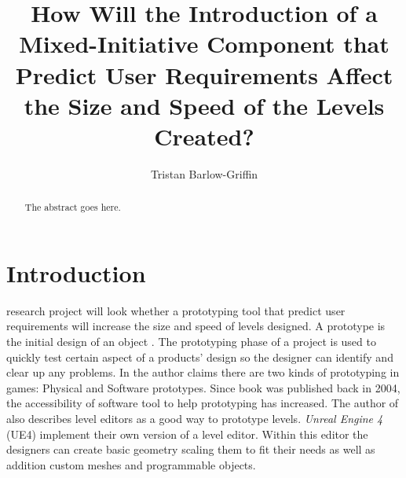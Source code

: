 \documentclass[journal]{IEEEtran}
\begin{document}
%
\title{ How Will the Introduction of a Mixed-Initiative Component that Predict User Requirements Affect the Size and Speed of the Levels Created?}
%
%

\author{Tristan Barlow-Griffin}


\maketitle

\begin{abstract}
The abstract goes here.
\end{abstract}





\section{Introduction} \label{intro}
 research project will look whether a prototyping tool that predict user requirements will increase the size and speed of levels designed. A prototype is the initial design of an object \cite{prototype}. The prototyping phase of a project is used to quickly test certain aspect of a products' design so the designer can identify and clear up any problems\cite{budde1992prototyping}. In \cite[p.~150]{fullerton2004game} the author claims there are two kinds of prototyping in games: Physical and Software prototypes. Since book was published back in 2004, the accessibility of software tool to help prototyping has increased. The author of \cite[p.~164]{fullerton2004game} also describes level editors as a good way to prototype levels. \textit{Unreal Engine 4} (UE4) implement their own version of a level editor. Within this editor the designers can create basic geometry scaling them to fit their needs as well as addition custom meshes and programmable objects.
\end{document}
